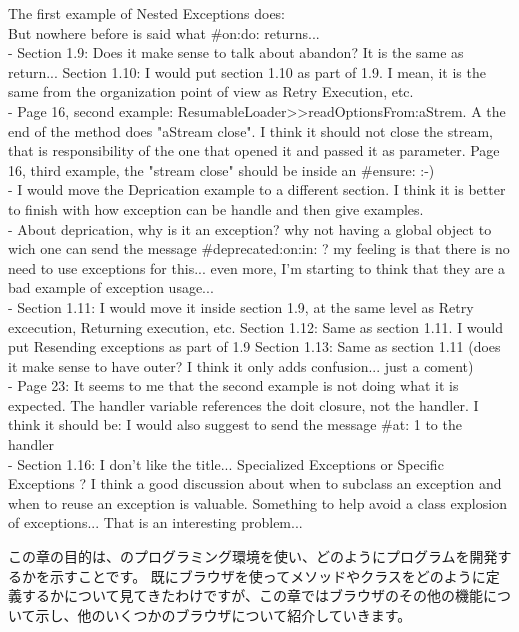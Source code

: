 \documentclass[a4paper,10pt,twoside]{book}
\begin{document}
{The first example of Nested Exceptions does:
\ct{result := [[ Error signal ....]}\\
But nowhere before is said what \#on:do: returns... \\
- Section 1.9: Does it make sense to talk about abandon? It is the same as return...
Section 1.10: I would put section 1.10 as part of 1.9. I mean, it is the same from the organization point of view as Retry Execution, etc. \\
- Page 16, second example: ResumableLoader>>readOptionsFrom:aStrem. A the end of the method does "aStream close". I think it should not close the stream, that is responsibility of the one that opened it and passed it as parameter.
Page 16, third example, the "stream close" should be inside an \#ensure: :-) \\
- I would move the Deprication example to a different section. I think it is better to finish with how exception can be handle and then give examples. \\
- About deprication, why is it an exception? why not having a global object to wich one can send the message \#deprecated:on:in: ? my feeling is that there is no need to use exceptions for this... even more, I'm starting to think that they are a bad example of exception usage... \\
- Section 1.11: I would move it inside section 1.9, at the same level as Retry excecution, Returning execution, etc.
Section 1.12: Same as section 1.11. I would put Resending exceptions as part of 1.9
Section 1.13: Same as section 1.11 (does it make sense to have outer? I think it only adds confusion... just a coment) \\
- Page 23: It seems to me that the second example is not doing what it is expected. The handler variable references the doit closure, not the handler. I think it should be:
I would also suggest to send the message \#at: 1 to the handler \\
- Section 1.16: I don't like the title... Specialized Exceptions or Specific Exceptions ?
I think a good discussion about when to subclass an exception and when to reuse an exception is valuable. Something to help avoid a class explosion of exceptions... That is an interesting problem... \\
}

この章の目的は、\pharo のプログラミング環境を使い、どのようにプログラムを開発するかを示すことです。
既にブラウザを使ってメソッドやクラスをどのように定義するかについて見てきたわけですが、この章ではブラウザのその他の機能について示し、他のいくつかのブラウザについて紹介していきます。
\end{document}
